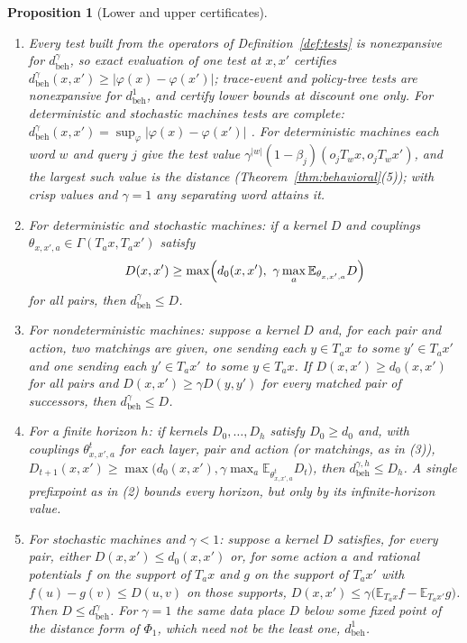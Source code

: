 \documentclass[11pt]{article}
\newcommand{\dbeh}{d_{\mathrm{beh}}}
\theoremstyle{definition}
\theoremstyle{plain}
\newtheorem{proposition}[definition]{Proposition}
\begin{document}
\begin{proposition}[Lower and upper certificates]\label{prop:certs}\mbox{}
\begin{enumerate}
\item Every test built from the operators of Definition~\ref{def:tests} is nonexpansive for
$\dbeh^\gamma$, so exact evaluation of one test at $x,x'$ certifies
$\dbeh^\gamma(x,x')\ge|\varphi(x)-\varphi(x')|$; trace-event and policy-tree tests are nonexpansive
for $\dbeh^1$, and certify lower bounds at discount one only. For deterministic and stochastic
machines tests are complete: $\dbeh^\gamma(x,x')=\sup_\varphi|\varphi(x)-\varphi(x')|$
\cite{dgjp,vbw}. For deterministic machines each word $w$ and query $j$ give the test value
$\gamma^{|w|}(1-\beta_j)(o_jT_wx,o_jT_wx')$, and the largest such value is the distance
(Theorem~\ref{thm:behavioral}(5)); with crisp values and $\gamma=1$ any separating word attains it.
\item For deterministic and stochastic machines: if a kernel $D$ and couplings
$\theta_{x,x',a}\in\Gamma(T_ax,T_ax')$ satisfy
\[
D(x,x')\ge\max\Bigl(d_0(x,x'),\ \gamma\max_a\mathbb E_{\theta_{x,x',a}}D\Bigr)
\]
for all pairs, then $\dbeh^\gamma\le D$.
\item For nondeterministic machines: suppose a kernel $D$ and, for each pair and action, two
matchings are given, one sending each $y\in T_ax$ to some $y'\in T_ax'$ and one sending each
$y'\in T_ax'$ to some $y\in T_ax$. If $D(x,x')\ge d_0(x,x')$ for all pairs and $D(x,x')\ge\gamma D(y,y')$ for every
matched pair of successors, then $\dbeh^\gamma\le D$.
\item For a finite horizon $h$: if kernels $D_0,\dots,D_h$ satisfy $D_0\ge d_0$ and, with
couplings $\theta^t_{x,x',a}$ for each layer, pair and action (or matchings, as in (3)),
$D_{t+1}(x,x')\ge\max\bigl(d_0(x,x'),\gamma\max_a\mathbb E_{\theta^t_{x,x',a}}D_t\bigr)$, then
$\dbeh^{\gamma,h}\le D_h$. A single prefixpoint as in (2) bounds every horizon, but only by its
infinite-horizon value.
\item For stochastic machines and $\gamma<1$: suppose a kernel $D$ satisfies, for every pair,
either $D(x,x')\le d_0(x,x')$ or, for some action $a$ and rational potentials $f$ on the support of
$T_ax$ and $g$ on the support of $T_ax'$ with $f(u)-g(v)\le D(u,v)$ on those supports,
$D(x,x')\le\gamma\bigl(\mathbb E_{T_ax}f-\mathbb E_{T_ax'}g\bigr)$. Then $D\le\dbeh^\gamma$. For
$\gamma=1$ the same data place $D$ below some fixed point of the distance form of $\Phi_1$, which
need not be the least one, $\dbeh^1$.
\end{enumerate}
\end{proposition}
\end{document}

